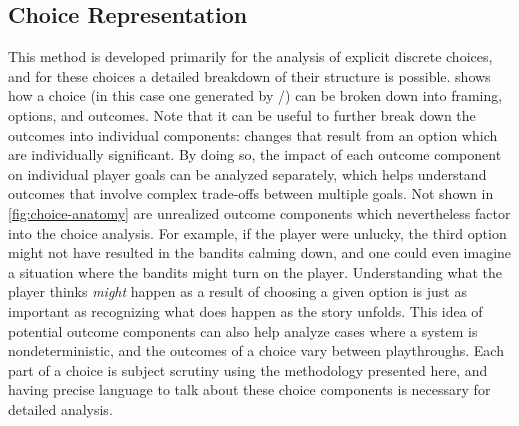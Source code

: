 \subsection{Choice Representation}

\label{sec:cp-choice-representation}

This method is developed primarily for the analysis of explicit discrete choices, and for these choices a detailed breakdown of their structure is possible.
%
 shows how a choice (in this case one generated by \dunyazad/) can be broken down into framing, options, and outcomes.
%
Note that it can be useful to further break down the outcomes into individual components: changes that result from an option which are individually significant.
%
By doing so, the impact of each outcome component on individual player goals can be analyzed separately, which helps understand outcomes that involve complex trade-offs between multiple goals.
%
Not shown in \cref{fig:choice-anatomy} are unrealized outcome components which nevertheless factor into the choice analysis.
%
For example, if the player were unlucky, the third option might not have resulted in the bandits calming down, and one could even imagine a situation where the bandits might turn on the player.
%
Understanding what the player thinks \emph{might} happen as a result of choosing a given option is just as important as recognizing what does happen as the story unfolds.
%
This idea of potential outcome components can also help analyze cases where a system is nondeterministic, and the outcomes of a choice vary between playthroughs.
%
Each part of a choice is subject scrutiny using the methodology presented here, and having precise language to talk about these choice components is necessary for detailed analysis.

